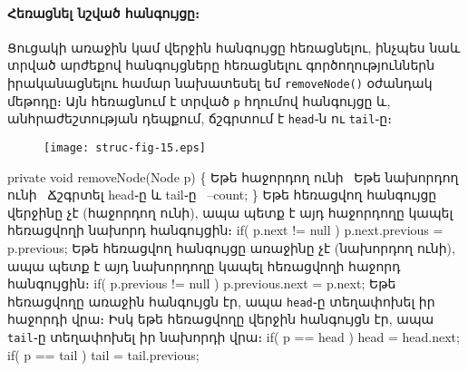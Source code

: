 \paragraph{Հեռացնել նշված հանգույցը։}
Ցուցակի առաջին կամ վերջին հանգույցը հեռացնելու, ինչպես նաև
տրված արժեքով հանգույցները հեռացնելու գործողություններն
իրականացնելու համար նախատեսել եմ \texttt{removeNode()} 
օժանդակ մեթոդը։ Այն հեռացնում է տրված \texttt{p} հղումով 
հանգույցը և, անհրաժեշտության դեպքում, ճշգրտում է 
\texttt{head}֊ն ու \texttt{tail}֊ը։
\begin{figure}[h]
\centering
\texttt{[image: struc-fig-15.eps]}
\end{figure}
\nwenddocs{}\endmoddef{}
private void removeNode(Node p)
\{
  \LA{}Եթե հաջորդող ունի~{\nwtagstyle{}}\RA{}
  \LA{}Եթե նախորդող ունի~{\nwtagstyle{}}\RA{}
  \LA{}Ճշգրտել head֊ը և tail֊ը~{\nwtagstyle{}}\RA{}
  --count;
\}
\nwendcode{}\nwdocspar
Եթե հեռացվող հանգույցը վերջինը չէ (հաջորդող ունի), ապա
պետք է այդ հաջորդողը կապել հեռացվողի նախորդ հանգույցին։
\nwenddocs{}\endmoddef{}
if( p.next != null )
  p.next.previous = p.previous;
\nwendcode{}\nwdocspar
Եթե հեռացվող հանգույցը առաջինը չէ (նախորդող ունի), ապա
պետք է այդ նախորդողը կապել հեռացվողի հաջորդ հանգույցին։
\nwenddocs{}\endmoddef{}
if( p.previous != null )
  p.previous.next = p.next;
\nwendcode{}\nwdocspar
Եթե հեռացվողը առաջին հանգույցն էր, ապա \texttt{head}֊ը
տեղափոխել իր հաջորդի վրա։ Իսկ եթե հեռացվողը վերջին 
հանգույցն էր, ապա \texttt{tail}֊ը տեղափոխել իր նախորդի 
վրա։
\nwenddocs{}\endmoddef{}
if( p == head )
  head = head.next;
if( p == tail )
  tail = tail.previous;
\nwendcode{}\nwdocspar

